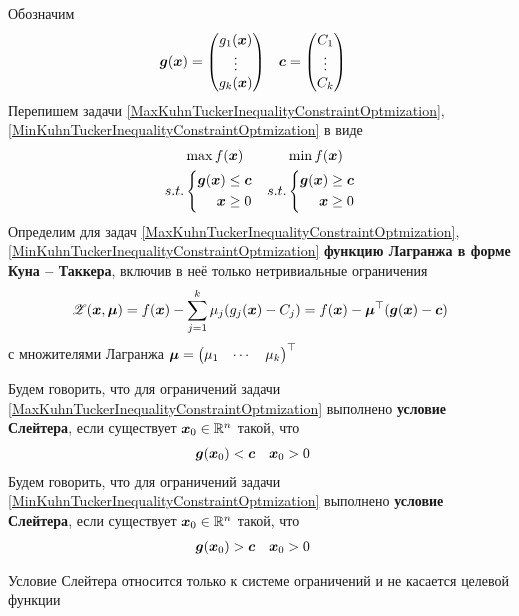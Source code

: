 Обозначим
\begin{align*}
	{\bm g}({\bm x})&=\begin{pmatrix}
		g_1({\bm x}) \\ \vdots \\ g_k({\bm x})
	\end{pmatrix} & {\bm c}&=\begin{pmatrix}
		C_1 \\ \vdots \\ C_k
	\end{pmatrix}
\end{align*}
Перепишем задачи \eqref{MaxKuhnTuckerInequalityConstraintOptmization},
\eqref{MinKuhnTuckerInequalityConstraintOptmization} в виде
\begin{align*}
	&\max f({\bm x}) & &\min f({\bm x}) \\
	s.t.&\left\{\begin{aligned} {\bm g}({\bm x})&\leq {\bm c} \\ {\bm x} &\geq 0\end{aligned}\right. &
	s.t.&\left\{\begin{aligned} {\bm g}({\bm x})&\geq {\bm c} \\ {\bm x} &\geq 0\end{aligned}\right.
\end{align*}
Определим для задач \eqref{MaxKuhnTuckerInequalityConstraintOptmization},
\eqref{MinKuhnTuckerInequalityConstraintOptmization}
\textbf{функцию Лагранжа в форме Куна -- Таккера}, включив в неё только
нетривиальные ограничения
\[
	{\mathscr Z}({\bm x},{\bm{\mu}})=f({\bm x})-\sum_{j=1}^k\mu_j(g_j({\bm x})-C_j)=
	f({\bm x})-{\bm{\mu}}^\top ({\bm g}({\bm x})-{\bm c})
\]
с множителями Лагранжа 
\({\bm{\mu}}=\begin{pmatrix} \mu_1 & \cdots & \mu_k \end{pmatrix}^\top \)
\begin{definicion}
Будем говорить, что для ограничений задачи \eqref{MaxKuhnTuckerInequalityConstraintOptmization} выполнено
\textbf{условие Слейтера}, если существует ${\bm x}_0\in{\mathbb R}^n$ такой, что
\begin{align*}
	{\bm g}({\bm x}_0)&<{\bm c} & {\bm x}_0&>0
\end{align*}
Будем говорить, что для ограничений задачи \eqref{MinKuhnTuckerInequalityConstraintOptmization} выполнено
\textbf{условие Слейтера}, если существует ${\bm x}_0\in{\mathbb R}^n$ такой, что 
\begin{align*}
	{\bm g}({\bm x}_0)&>{\bm c} & {\bm x}_0&>0
\end{align*}
\end{definicion}
\begin{remark}
Условие Слейтера относится только к системе ограничений и не касается целевой функции
\end{remark}
	
